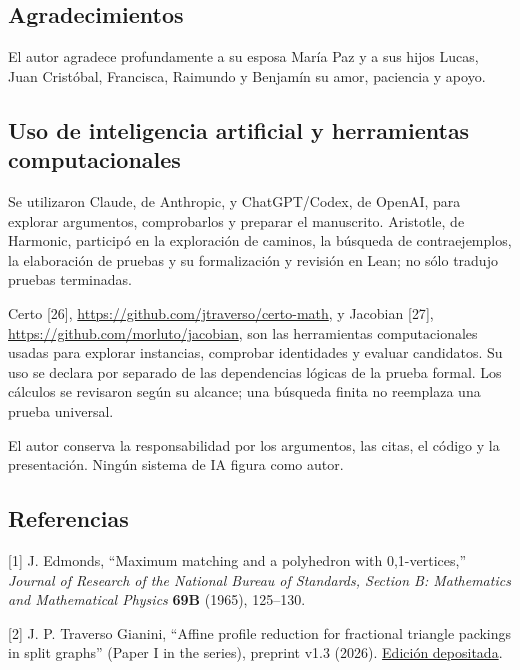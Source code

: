 \documentclass[spanish,11pt,a4paper]{article}
\begin{document}
\subsection{Agradecimientos}\label{agradecimientos}

El autor agradece profundamente a su esposa María Paz y a sus hijos
Lucas, Juan Cristóbal, Francisca, Raimundo y Benjamín su amor, paciencia
y apoyo.

\subsection{Uso de inteligencia artificial y herramientas
computacionales}\label{uso-de-inteligencia-artificial-y-herramientas-computacionales}

Se utilizaron Claude, de Anthropic, y ChatGPT/Codex, de OpenAI, para
explorar argumentos, comprobarlos y preparar el manuscrito. Aristotle,
de Harmonic, participó en la exploración de caminos, la búsqueda de
contraejemplos, la elaboración de pruebas y su formalización y revisión
en Lean; no sólo tradujo pruebas terminadas.

Certo {[}26{]}, \url{https://github.com/jtraverso/certo-math}, y
Jacobian {[}27{]}, \url{https://github.com/morluto/jacobian}, son las
herramientas computacionales usadas para explorar instancias, comprobar
identidades y evaluar candidatos. Su uso se declara por separado de las
dependencias lógicas de la prueba formal. Los cálculos se revisaron
según su alcance; una búsqueda finita no reemplaza una prueba universal.

El autor conserva la responsabilidad por los argumentos, las citas, el
código y la presentación. Ningún sistema de IA figura como autor.

\begingroup\setlength{\parskip}{0pt}
\subsection{Referencias}\label{referencias}

{[}1{]} J. Edmonds, ``Maximum matching and a polyhedron with
0,1-vertices,'' \emph{Journal of Research of the National Bureau of
Standards, Section B: Mathematics and Mathematical Physics} \textbf{69B}
(1965), 125--130.

{[}2{]} J. P. Traverso Gianini, ``Affine profile reduction for
fractional triangle packings in split graphs'' (Paper I in the series),
preprint v1.3 (2026).
\href{https://doi.org/10.5281/zenodo.23089131}{Edición depositada}.
\end{document}
